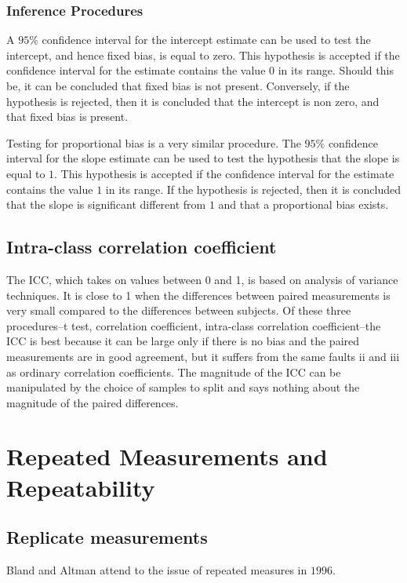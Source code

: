 \documentclass[12pt, a4paper]{report}
\theoremstyle{plain}
\theoremstyle{definition}
\theoremstyle{remark}
\begin{document}
\subsection{Inference Procedures}
A $95\%$ confidence interval for the intercept estimate can be used to test the intercept, and hence fixed bias, is equal to
zero. This hypothesis is accepted if the confidence interval for the estimate contains the value $0$ in its range. Should this be,
it can be concluded that fixed bias is not present. Conversely, if the hypothesis is rejected, then it is concluded that the
intercept is non zero, and that fixed bias is present.

Testing for proportional bias is a very similar procedure. The $95\%$ confidence interval for the slope estimate can be used to
test the hypothesis that the slope is equal to $1$. This hypothesis is accepted if the confidence interval for the estimate
contains the value $1$ in its range. If the hypothesis is rejected, then it is concluded that the slope is significant
different from $1$ and that a proportional bias exists.

	\section*{Intra-class correlation coefficient}
 
	The ICC, which takes on values between 0 and 1, is based on analysis of variance techniques. It is close to 1 when the differences between paired measurements is very small compared to the differences between subjects. Of these three procedures--t test, correlation coefficient, intra-class correlation coefficient--the ICC is best because it can be large only if there is no bias and the paired measurements are in good agreement, but it suffers from the same faults ii and iii as ordinary correlation coefficients. The magnitude of the ICC can be manipulated by the choice of samples to split and says nothing about the magnitude of the paired differences.


	



\chapter{Repeated Measurements and Repeatability}
	
	
	
	\section{Replicate measurements}
	Bland and Altman attend to the issue of repeated measures in
	$1996$.
	
\end{document}
